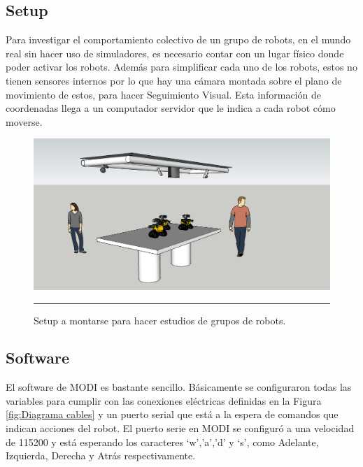 
\subsection{Setup}

Para investigar el comportamiento colectivo de un grupo de robots, en el mundo real sin hacer uso de simuladores, es necesario contar con un lugar físico donde poder activar los robots. Además para simplificar cada uno de los robots, estos no tienen sensores internos por lo que hay una cámara montada sobre el plano de movimiento de estos, para hacer Seguimiento Visual. Esta información de coordenadas llega a un computador servidor que le indica a cada robot cómo moverse.
\begin{figure}[htbp]
	\centering
		\includegraphics[width=\textwidth]{./Figures/setup.png}
		\rule{35em}{0.5pt}
	\caption[Setup Enjambre MODI]{Setup a montarse para hacer estudios de grupos de robots.}
	\label{fig:setup}
\end{figure}

\subsection{Software}

El software de MODI es bastante sencillo. Básicamente se configuraron todas las variables para cumplir con las conexiones eléctricas definidas en la Figura \ref{fig:Diagrama cables} y un puerto serial que está a la espera de comandos que indican acciones del robot. El puerto serie en MODI se configuró a una velocidad de 115200 y está esperando los caracteres ‘w’,’a’,’d’ y ‘s’, como Adelante, Izquierda, Derecha y Atrás respectivamente. 

